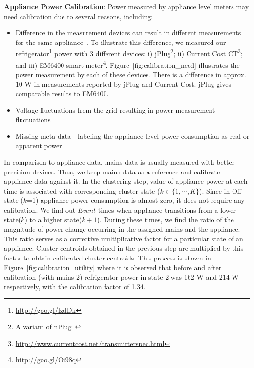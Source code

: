 \documentclass[conference]{IEEEtran}
\newcommand{\redcolor}[1]{\textcolor{red}{#1}}
\newcommand{\figref}[1]{Figure~\ref{#1}}
\newcommand{\denselistbib}{
  \itemsep -.6pt\topsep-4pt\partopsep-4pt
}
\begin{document}
\noindent\textbf{Appliance Power Calibration}: 
Power measured by appliance level meters may need calibration due to several reasons, including:
\begin{itemize}\denselistbib
\item Difference in the measurement devices can result in different measurements for the same appliance~\cite{berges2008}. To illustrate this difference, we measured our refrigerator\footnote{
\url{http://goo.gl/lzdDk}} power with 3 different devices: i) jPlug\footnote{A variant of nPlug~\cite{nplug}}; ii) Current Cost CT\footnote{\url{http://www.currentcost.net/transmitterspec.html}}; and iii) EM6400 smart meter\footnote{\url{http://goo.gl/Oi98q}}. 
\figref{fig:calibration_need} illustrates the power measurement by each of these devices. There is a difference in approx. 10 W in measurements reported by jPlug and Current Cost. jPlug gives comparable results to EM6400.
\item Voltage fluctuations from the grid resulting in power measurement fluctuations~\cite{hart}
\item Missing meta data - labeling the appliance level power consumption as real or apparent power 
\end{itemize} 

\noindent In comparison to appliance data, mains data is usually measured with better precision devices. Thus, we keep mains data as a reference and calibrate appliance data against it. In the clustering step, value of appliance power at each time is associated with corresponding cluster state ($k \in \{1,\cdots,K\}$). Since in Off state ($k$=1) appliance power consumption is almost zero, it does not require any calibration. We find out $Event$ times when appliance transitions from a lower state($k$) to a higher state($k+1$). During these times, we find the ratio of the magnitude of power change occurring in the assigned mains and the appliance. This ratio serves as a corrective multiplicative factor for a particular  state of an appliance. Cluster centroids obtained in the previous step are multiplied by this factor to obtain calibrated cluster centroids. This process is shown in \figref{fig:calibration_utility} where it is observed that before and after calibration (with mains 2) refrigerator power in state 2 was 162 W and 214 W respectively, with the calibration factor of 1.34.
\end{document}
